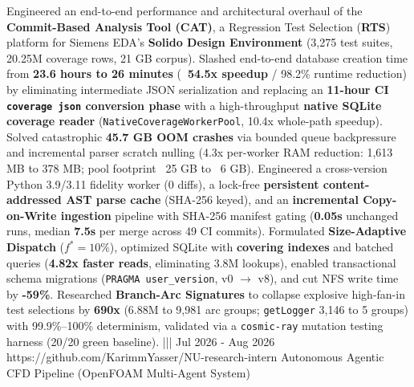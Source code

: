 {    {Engineered an end-to-end performance and architectural overhaul of the \textbf{Commit-Based Analysis Tool (CAT)}, a Regression Test Selection (\textbf{RTS}) platform for Siemens EDA's \textbf{Solido Design Environment} (3,275 test suites, 20.25M coverage rows, 21 GB corpus). Slashed end-to-end database creation time from \textbf{23.6 hours to 26 minutes} (\textbf{~54.5x speedup} / 98.2\% runtime reduction) by eliminating intermediate JSON serialization and replacing an \textbf{11-hour CI \texttt{coverage json} conversion phase} with a high-throughput \textbf{native SQLite coverage reader} (\texttt{NativeCoverageWorkerPool}, 10.4x whole-path speedup). Solved catastrophic \textbf{45.7 GB OOM crashes} via bounded queue backpressure and incremental parser scratch nulling (4.3x per-worker RAM reduction: 1,613 MB to 378 MB; pool footprint ~25 GB to ~6 GB). Engineered a cross-version Python 3.9/3.11 fidelity worker (0 diffs), a lock-free \textbf{persistent content-addressed AST parse cache} (SHA-256 keyed), and an \textbf{incremental Copy-on-Write ingestion} pipeline with SHA-256 manifest gating (\textbf{0.05s} unchanged runs, median \textbf{7.5s} per merge across 49 CI commits). Formulated \textbf{Size-Adaptive Dispatch} ($f^*=10\%$), optimized SQLite with \textbf{covering indexes} and batched queries (\textbf{4.82x faster reads}, eliminating 3.8M lookups), enabled transactional schema migrations (\texttt{PRAGMA user\_version}, v0 $\to$ v8), and cut NFS write time by \textbf{-59\%}. Researched \textbf{Branch-Arc Signatures} to collapse explosive high-fan-in test selections by \textbf{690x} (6.88M to 9,981 arc groups; \texttt{getLogger} 3,146 to 5 groups) with 99.9\%--100\% determinism, validated via a \texttt{cosmic-ray} mutation testing harness (20/20 green baseline).}%
    |||
    {Jul 2026 - Aug 2026}%
    {https://github.com/KarimmYasser/NU-research-intern}%
    {Autonomous Agentic CFD Pipeline (OpenFOAM Multi-Agent System)}%
}
